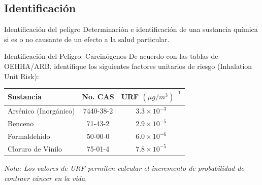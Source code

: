 \documentclass[10pt,compress]{beamer}
\begin{document}
\subsection{Identificación}
\begin{frame}{Identificación del peligro}
Determinación e identificación de una sustancia química si es o no causante de un efecto a la salud particular.
\end{frame}
\begin{frame}{Identificación del Peligro: Carcinógenos}
    De acuerdo con las tablas de OEHHA/ARB, identifique los siguientes factores unitarios de riesgo (Inhalation Unit Risk):
    \begin{table}
        \centering
        \begin{tabular}{|l|c|c|}
            \hline
            \textbf{Sustancia} & \textbf{No. CAS} & \textbf{URF $(\mu g/m^3)^{-1}$} \\
            \hline
            Arsénico (Inorgánico) & 7440-38-2 & $3.3 \times 10^{-3}$ \\
            Benceno & 71-43-2 & $2.9 \times 10^{-5}$ \\
            Formaldehído & 50-00-0 & $6.0 \times 10^{-6}$ \\
            Cloruro de Vinilo & 75-01-4 & $7.8 \times 10^{-5}$ \\
            \hline
        \end{tabular}
    \end{table}
    \textit{Nota: Los valores de URF permiten calcular el incremento de probabilidad de contraer cáncer en la vida.}
\end{frame}
\end{document}
